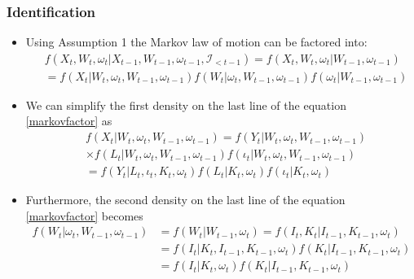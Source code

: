 \documentclass{beamer}
\begin{document}
\begin{frame}
\frametitle{Identification}
\begin{itemize}
\item Using Assumption 1 the Markov law of motion can be factored into:
\begin{equation} \label{markovfactor}
    \begin{split}
        &f(X_{t}, W_{t}, \omega_{t}|X_{t-1}, W_{t-1}, \omega_{t-1}, \mathcal{I}_{<t-1})=f(X_{t}, W_{t}, \omega_{t}|W_{t-1}, \omega_{t-1})\\
        &=f(X_{t}|W_{t}, \omega_{t}, W_{t-1}, \omega_{t-1})f(W_{t}|\omega_{t}, W_{t-1}, \omega_{t-1})f(\omega_{t}|W_{t-1}, \omega_{t-1})
    \end{split}
\end{equation} 
\item We can simplify the first density on the last line of the equation \eqref{markovfactor} as
\begin{equation} \label{1stdensity}
\begin{split}
&f(X_{t}|W_{t}, \omega_{t}, W_{t-1}, \omega_{t-1})=f(Y_{t}|W_{t}, \omega_{t}, W_{t-1}, \omega_{t-1})\\
&\times f(L_{t}|W_{t}, \omega_{t}, W_{t-1}, \omega_{t-1})f(\iota_{t}|W_{t}, \omega_{t}, W_{t-1}, \omega_{t-1})\\
&=f(Y_{t}|L_{t}, \iota_{t}, K_{t}, \omega_{t})f(L_{t}|K_{t}, \omega_{t})f(\iota_{t}|K_{t}, \omega_{t})
\end{split}
\end{equation}
\item Furthermore, the second density on the last line of the equation \eqref{markovfactor} becomes
\begin{equation} \label{2nddensity}
    \begin{split}
        f(W_{t}|\omega_{t}, W_{t-1}, \omega_{t-1})&=f(W_{t}|W_{t-1}, \omega_{t})=f(I_{t}, K_{t}|I_{t-1}, K_{t-1}, \omega_{t})\\
        &=f(I_{t}|K_{t}, I_{t-1}, K_{t-1}, \omega_{t})f(K_{t}|I_{t-1}, K_{t-1}, \omega_{t})\\
        &=f(I_{t}|K_{t}, \omega_{t})f(K_{t}|I_{t-1}, K_{t-1}, \omega_{t})
    \end{split}
\end{equation} 
\end{itemize}
\end{frame}
\end{document}
